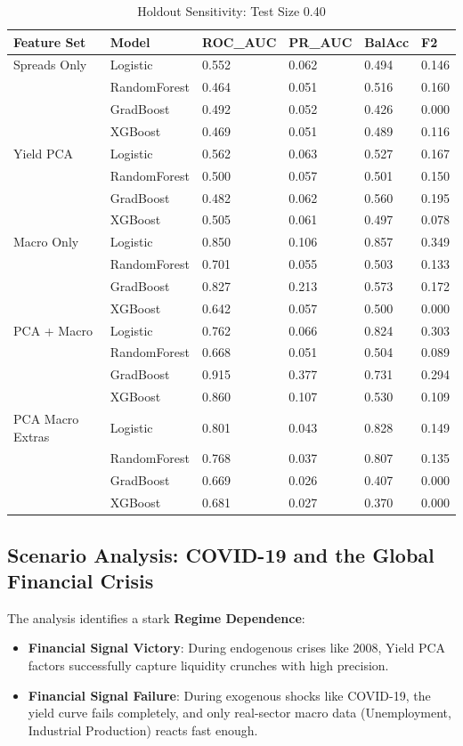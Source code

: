 \begin{table}[h!]
\centering
\caption{Holdout Sensitivity: Test Size 0.40}
\small
\begin{tabular}{@{}llllll@{}}
\toprule
\textbf{Feature Set} & \textbf{Model} & \textbf{ROC\_AUC} & \textbf{PR\_AUC} & \textbf{BalAcc} & \textbf{F2} \\ \midrule
Spreads Only & Logistic & 0.552 & 0.062 & 0.494 & 0.146 \\
& RandomForest & 0.464 & 0.051 & 0.516 & 0.160 \\
& GradBoost & 0.492 & 0.052 & 0.426 & 0.000 \\
& XGBoost & 0.469 & 0.051 & 0.489 & 0.116 \\ \midrule
Yield PCA & Logistic & 0.562 & 0.063 & 0.527 & 0.167 \\
& RandomForest & 0.500 & 0.057 & 0.501 & 0.150 \\
& GradBoost & 0.482 & 0.062 & 0.560 & 0.195 \\
& XGBoost & 0.505 & 0.061 & 0.497 & 0.078 \\ \midrule
Macro Only & Logistic & 0.850 & 0.106 & 0.857 & 0.349 \\
& RandomForest & 0.701 & 0.055 & 0.503 & 0.133 \\
& GradBoost & 0.827 & 0.213 & 0.573 & 0.172 \\
& XGBoost & 0.642 & 0.057 & 0.500 & 0.000 \\ \midrule
PCA + Macro & Logistic & 0.762 & 0.066 & 0.824 & 0.303 \\
& RandomForest & 0.668 & 0.051 & 0.504 & 0.089 \\
& GradBoost & 0.915 & 0.377 & 0.731 & 0.294 \\
& XGBoost & 0.860 & 0.107 & 0.530 & 0.109 \\ \midrule
PCA Macro Extras & Logistic & 0.801 & 0.043 & 0.828 & 0.149 \\
& RandomForest & 0.768 & 0.037 & 0.807 & 0.135 \\
& GradBoost & 0.669 & 0.026 & 0.407 & 0.000 \\
& XGBoost & 0.681 & 0.027 & 0.370 & 0.000 \\ \bottomrule
\end{tabular}
\end{table}


\subsection{Scenario Analysis: COVID-19 and the Global Financial Crisis}
The analysis identifies a stark \textbf{Regime Dependence}:
\begin{itemize}
    \item \textbf{Financial Signal Victory}: During endogenous crises like 2008, Yield PCA factors successfully capture liquidity crunches with high precision.
    \item \textbf{Financial Signal Failure}: During exogenous shocks like COVID-19, the yield curve fails completely, and only real-sector macro data (Unemployment, Industrial Production) reacts fast enough.
\end{itemize}


